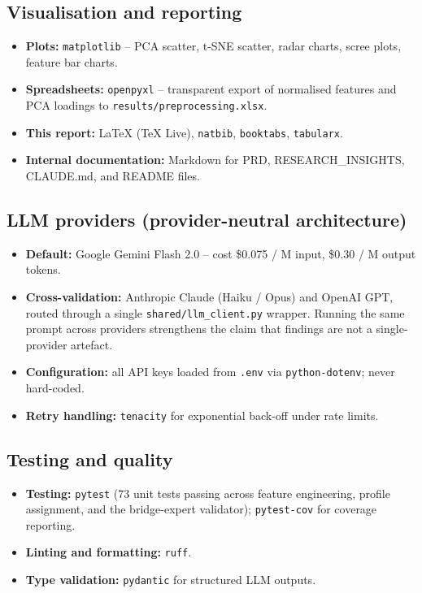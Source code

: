 \documentclass[11pt, a4paper, oneside, openany]{report}
\begin{document}
\subsection*{Visualisation and reporting}
\begin{itemize}[leftmargin=*]
    \item \textbf{Plots:} \texttt{matplotlib} -- PCA scatter, t-SNE scatter, radar charts, scree plots, feature bar charts.
    \item \textbf{Spreadsheets:} \texttt{openpyxl} -- transparent export of normalised features and PCA loadings to \texttt{results/preprocessing.xlsx}.
    \item \textbf{This report:} \LaTeX{} (TeX Live), \texttt{natbib}, \texttt{booktabs}, \texttt{tabularx}.
    \item \textbf{Internal documentation:} Markdown for PRD, RESEARCH\_INSIGHTS, CLAUDE.md, and README files.
\end{itemize}

\subsection*{LLM providers (provider-neutral architecture)}
\begin{itemize}[leftmargin=*]
    \item \textbf{Default:} Google Gemini Flash 2.0 -- cost \$0.075 / M input, \$0.30 / M output tokens.
    \item \textbf{Cross-validation:} Anthropic Claude (Haiku / Opus) and OpenAI GPT, routed through a single \texttt{shared/llm\_client.py} wrapper. Running the same prompt across providers strengthens the claim that findings are not a single-provider artefact.
    \item \textbf{Configuration:} all API keys loaded from \texttt{.env} via \texttt{python-dotenv}; never hard-coded.
    \item \textbf{Retry handling:} \texttt{tenacity} for exponential back-off under rate limits.
\end{itemize}

\subsection*{Testing and quality}
\begin{itemize}[leftmargin=*]
    \item \textbf{Testing:} \texttt{pytest} (73 unit tests passing across feature engineering, profile assignment, and the bridge-expert validator); \texttt{pytest-cov} for coverage reporting.
    \item \textbf{Linting and formatting:} \texttt{ruff}.
    \item \textbf{Type validation:} \texttt{pydantic} for structured LLM outputs.
\end{itemize}
\end{document}
